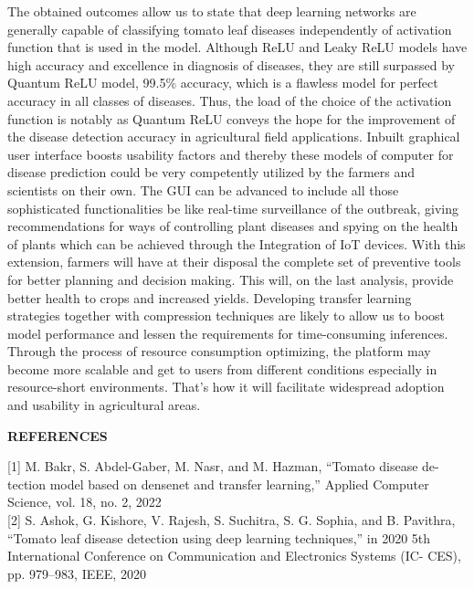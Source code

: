 \documentclass[12pt, English]{article}
\newcommand\tab[1][1cm]{\hspace*{#1}}
\begin{document}
\begin{normalsize}
\tab
The obtained outcomes allow us to state that deep learning networks are generally capable of classifying tomato leaf diseases independently of activation function that is used in the model. Although ReLU and Leaky ReLU models have high accuracy and excellence in diagnosis of diseases, they are still surpassed by Quantum ReLU model, 99.5\% accuracy, which is a flawless model for perfect accuracy in all classes of diseases. Thus, the load of the choice of the activation function is notably as Quantum ReLU conveys the hope for the improvement of the disease detection accuracy in agricultural field applications. Inbuilt graphical user interface boosts usability factors and thereby these models of computer for disease prediction could be very competently utilized by the farmers and scientists on their own.
\newline
\tab
The GUI can be advanced to include all those sophisticated functionalities be like real-time surveillance of the outbreak, giving recommendations for ways of controlling plant diseases and spying on the health of plants which can be achieved through the Integration of IoT devices. With this extension, farmers will have at their disposal the complete set of preventive tools for better planning and decision making. This will, on the last analysis, provide better health to crops and increased yields. Developing transfer learning strategies together with compression techniques are likely to allow us to boost model performance and lessen the requirements for time-consuming inferences. Through the process of resource consumption optimizing, the platform may become more scalable and get to users from different conditions especially in resource-short environments. That's how it will facilitate widespread adoption and usability in agricultural areas.



\newpage
\begin{large}
\textbf{REFERENCES}
\end{large}

\vspace*{0.08in}
\begin{normalsize}

[1] M. Bakr, S. Abdel-Gaber, M. Nasr, and M. Hazman, “Tomato disease de-
tection model based on densenet and transfer learning,” Applied Computer
Science, vol. 18, no. 2, 2022\\

[2] S. Ashok, G. Kishore, V. Rajesh, S. Suchitra, S. G. Sophia, and B. Pavithra,
“Tomato leaf disease detection using deep learning techniques,” in 2020 5th
International Conference on Communication and Electronics Systems (IC-
CES), pp. 979–983, IEEE, 2020\\


\end{normalsize}
\end{normalsize}
\end{document}
